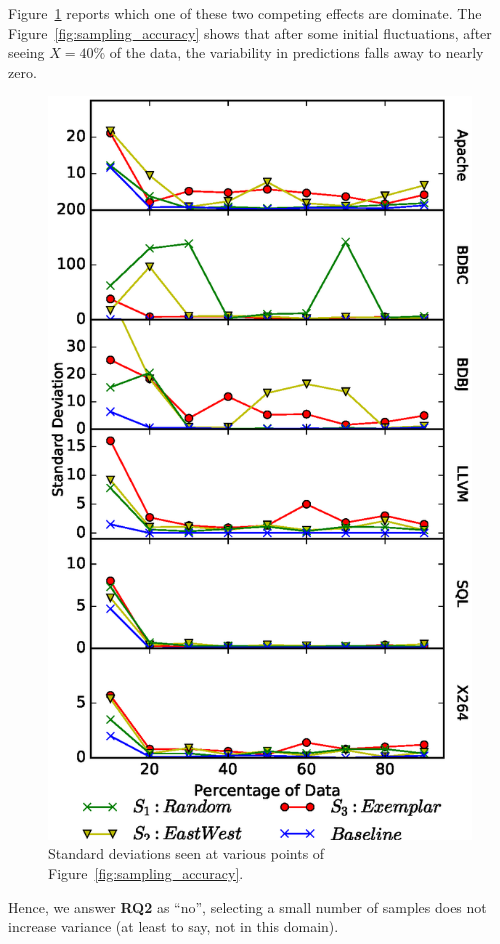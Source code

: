 \documentclass{sig-alternative}
\newcommand{\fig}[1]{Figure~\ref{fig:#1}}
\begin{document}
\fig{Variance} reports which one of these two competing effects are dominate. 
The \fig{sampling_accuracy} shows that after some initial fluctuations,
after seeing $X=40$\% of the data, the variability in predictions falls away to nearly zero.


\begin{figure}[!t]
\includegraphics[width=0.9\linewidth]{Figures/Variance.eps}
\caption{Standard deviations seen at various points of  \fig{sampling_accuracy}.}\label{fig:Variance}
\end{figure}

\begin{myshadowbox}
Hence, we answer {\bf RQ2} as ``no'', selecting a small number of samples does not increase variance (at least to say, not in this domain).
\end{myshadowbox}
\end{document}
